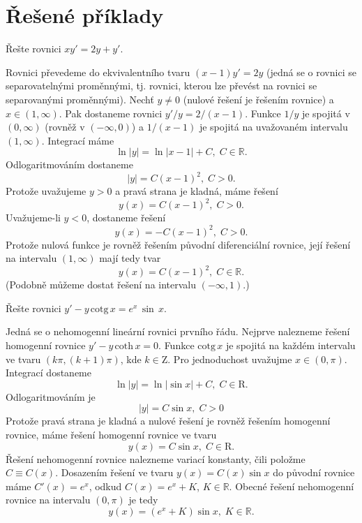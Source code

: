 \section*{Řešené příklady}

\begin{ex}
   Řešte rovnici $xy'=2y+y'$.
\end{ex}
\begin{sol}
   Rovnici převedeme do ekvivalentního tvaru $(x-1)y'=2y$ (jedná se o rovnici se separovatelnými proměnnými,
   tj. rovnici, kterou lze převést na rovnici se separovanými proměnnými).
   Nechť $y\neq 0$ (nulové řešení je řešením rovnice) a $x\in(1,\infty)$.
   Pak dostaneme rovnici $y'/y=2/(x-1)$. Funkce $1/y$ je spojitá v $(0,\infty)$ (rovněž v $(-\infty,0)$)
   a $1/(x-1)$ je spojitá na uvažovaném intervalu $(1,\infty)$.
   Integrací máme
   \[
      \ln|y| = \ln|x-1|+C, \; C\in\mathbb{R}.
   \]
   Odlogaritmováním dostaneme
   \[
      |y| = C(x-1)^2, \; C>0.
   \]
   Protože uvažujeme $y>0$ a pravá strana je kladná, máme řešení
   \[
      y(x) = C(x-1)^2, \; C>0.
   \] 
   Uvažujeme-li $y<0$, dostaneme řešení
   \[
      y(x) = -C(x-1)^2, \;C>0.
   \]
   Protože nulová funkce je rovněž řešením původní diferenciální rovnice,
   její řešení na intervalu $(1,\infty)$ mají tedy tvar
   \[
      y(x) = C(x-1)^2, \; C\in\mathbb{R}.
   \]
   (Podobně můžeme dostat řešení na intervalu $(-\infty,1)$.)
\end{sol}

\begin{ex}
   Řešte rovnici $y'-y\,\mathrm{cotg}\,x=e^x\,\sin\,x$.
\end{ex}
\begin{sol}
   Jedná se o nehomogenní lineární rovnici prvního řádu.
   Nejprve nalezneme řešení homogenní rovnice $y'-y\,\mathrm{coth}\,x=0$.
   Funkce $\mathrm{cotg}\,x$ je spojitá na každém intervalu ve tvaru
   $(k\pi,(k+1)\pi)$, kde $k\in\mathrm{Z}$.
   Pro jednoduchost uvažujme $x\in(0,\pi)$.
   Integrací dostaneme
   \[
      \ln |y| = \ln |\sin x|+C, \; C\in\mathrm{R}.
   \]
   Odlogaritmováním je
   \[
      |y| = C\sin x, \; C>0
   \]
   Protože pravá strana je kladná a nulové řešení je rovněž řešením homogenní rovnice, 
   máme řešení homogenní rovnice ve tvaru
   \[
      y(x) = C\sin x,\; C\in\mathrm{R}.
   \]
   Řešení nehomogenní rovnice nalezneme variací konstanty, čili položme $C\equiv C(x)$.
   Dosazením řešení ve tvaru $y(x)=C(x)\sin x$ do původní rovnice máme $C'(x) = e^x$,
   odkud $C(x) = e^x+K$, $K\in\mathbb{R}$.
   Obecné řešení nehomogenní rovnice na intervalu $(0,\pi)$ je tedy
   \[
      y(x) = (e^x+K)\sin x, \; K\in\mathbb{R}.
   \]
\end{sol}

